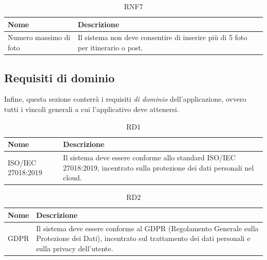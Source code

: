 \documentclass{natourDoc}
\begin{document}
\begin{table}[H]
	\centering
	\begin{tabular}{ |p{5cm}|p{10.3cm}| }
		\hline
		\rowcolor{PineGreen!70}
		\textbf{Nome}          & \textbf{Descrizione}                                                            \\
		\hline
		Numero massimo di foto & Il sistema non deve consentire di inserire più di 5 foto per itinerario o post. \\
		\hline
	\end{tabular}
	\caption{RNF7}
\end{table}

\newpage
\subsection{Requisiti di dominio}
Infine, questa sezione conterrà i requisiti \textit{di dominio} dell'applicazione, ovvero tutti i vincoli generali a cui l'applicativo
deve attenersi. \\

\begin{table}[H]
	\centering
	\begin{tabular}{ |p{5cm}|p{10.3cm}| }
		\hline
		\rowcolor{PineGreen!70}
		\textbf{Nome}      & \textbf{Descrizione}                                              \\
		\hline
		ISO/IEC 27018:2019 & Il sistema deve essere conforme allo standard ISO/IEC 27018:2019,
		incentrato sulla protezione dei dati personali nel cloud.                              \\
		\hline
	\end{tabular}
	\caption{RD1}

\end{table}

\begin{table}[H]
	\centering
	\begin{tabular}{ |p{5cm}|p{10.3cm}| }
		\hline
		\rowcolor{PineGreen!70}
		\textbf{Nome} & \textbf{Descrizione}                                                                      \\
		\hline
		GDPR          & Il sistema deve essere conforme al GDPR (Regolamento Generale sulla Protezione dei Dati),
		incentrato sul trattamento dei dati personali e sulla privacy dell’utente.                                \\
		\hline
	\end{tabular}
	\caption{RD2}

\end{table}
\end{document}
